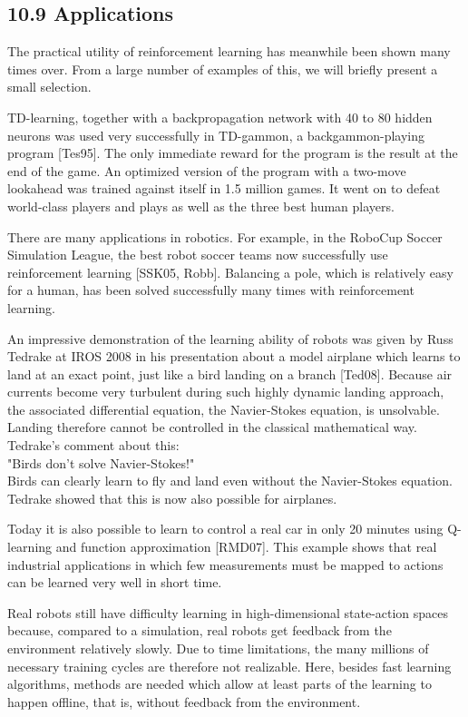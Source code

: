 \documentclass[10pt]{article}
\begin{document}
\subsection*{10.9 Applications}
The practical utility of reinforcement learning has meanwhile been shown many times over. From a large number of examples of this, we will briefly present a small selection.

TD-learning, together with a backpropagation network with 40 to 80 hidden neurons was used very successfully in TD-gammon, a backgammon-playing program [Tes95]. The only immediate reward for the program is the result at the end of the game. An optimized version of the program with a two-move lookahead was trained against itself in 1.5 million games. It went on to defeat world-class players and plays as well as the three best human players.

There are many applications in robotics. For example, in the RoboCup Soccer Simulation League, the best robot soccer teams now successfully use reinforcement learning [SSK05, Robb]. Balancing a pole, which is relatively easy for a human, has been solved successfully many times with reinforcement learning.

An impressive demonstration of the learning ability of robots was given by Russ Tedrake at IROS 2008 in his presentation about a model airplane which learns to land at an exact point, just like a bird landing on a branch [Ted08]. Because air currents become very turbulent during such highly dynamic landing approach, the associated differential equation, the Navier-Stokes equation, is unsolvable. Landing therefore cannot be controlled in the classical mathematical way. Tedrake's comment about this:\\
"Birds don't solve Navier-Stokes!"\\
Birds can clearly learn to fly and land even without the Navier-Stokes equation. Tedrake showed that this is now also possible for airplanes.

Today it is also possible to learn to control a real car in only 20 minutes using Q-learning and function approximation [RMD07]. This example shows that real industrial applications in which few measurements must be mapped to actions can be learned very well in short time.

Real robots still have difficulty learning in high-dimensional state-action spaces because, compared to a simulation, real robots get feedback from the environment relatively slowly. Due to time limitations, the many millions of necessary training cycles are therefore not realizable. Here, besides fast learning algorithms, methods are needed which allow at least parts of the learning to happen offline, that is, without feedback from the environment.
\end{document}
